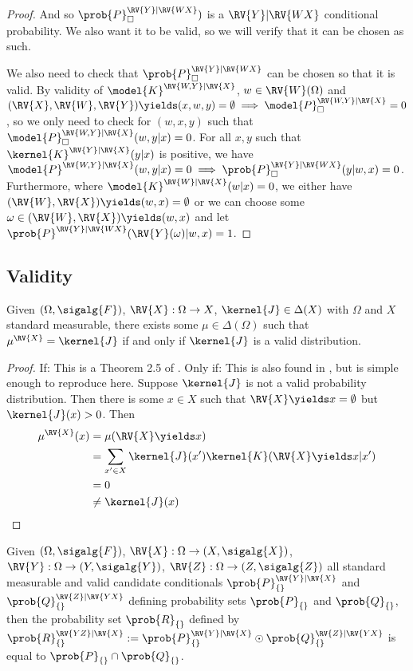 \begin{proof}
And so $\prob{P}_\square^{\RV{Y}|\RV{WX}})$ is a $\RV{Y}|\RV{WX}$ conditional probability. We also want it to be valid, so we will verify that it can be chosen as such.

We also need to check that $\prob{P}_\square^{\RV{Y}|\RV{WX}}$ can be chosen so that it is valid. By validity of $\model{K}^{\RV{W,Y}|\RV{X}}$, $w\in \RV{W}(\Omega)$ and $(\RV{X},\RV{W},\RV{Y})\yields(x,w,y)=\emptyset \implies \model{P}_\square^{\RV{W,Y}|\RV{X}}=0$, so we only need to check for $(w,x,y)$ such that $\model{P}_\square^{\RV{W,Y}|\RV{X}}(w,y|x)=0$. For all $x,y$ such that $\kernel{K}^{\RV{Y}|\RV{X}}(y|x)$ is positive, we have $\model{P}^{\RV{W,Y}|\RV{X}}(w,y|x)=0\implies \prob{P}_\square^{\RV{Y}|\RV{WX}}(y|w,x)=0$. Furthermore, where $\model{K}^{\RV{W}|\RV{X}}(w|x)=0$, we either have $(\RV{W},\RV{X})\yields(w,x)=\emptyset$ or we can choose some $\omega\in (\RV{W},\RV{X})\yields(w,x)$ and let $\prob{P}^{\RV{Y}|\RV{WX}}(\RV{Y}(\omega)|w,x) = 1$.
\end{proof}


\subsection{Validity}

\begin{theorem}[Validity]\label{th:completion}
Given $(\Omega,\sigalg{F})$, $\RV{X}:\Omega\to X$, $\kernel{J}\in \Delta(X)$ with $\Omega$ and $X$ standard measurable, there exists some $\mu\in \Delta(\Omega)$ such that $\mu^{\RV{X}}=\kernel{J}$ if and only if $\kernel{J}$ is a valid distribution.
\end{theorem}

\begin{proof}
If:
This is a Theorem 2.5 of \citet{ershov_extension_1975}.
Only if:
This is also found in \citet{ershov_extension_1975}, but is simple enough to reproduce here. Suppose $\kernel{J}$ is not a valid probability distribution. Then there is some $x\in X$ such that $\RV{X}\yields x = \emptyset$ but $\kernel{J}(x)>0$. Then
\begin{align}
    \mu^{\RV{X}}(x) &= \mu (\RV{X}\yields x)\\
    &= \sum_{x'\in X} \kernel{J}(x') \kernel{K}(\RV{X}\yields x|x')\\
    &= 0\\
    &\neq \kernel{J}(x)
\end{align}
\end{proof}


\begin{theorem}\label{th:intersection}
Given $(\Omega,\sigalg{F})$, $\RV{X}:\Omega\to (X,\sigalg{X})$, $\RV{Y}:\Omega\to (Y,\sigalg{Y})$, $\RV{Z}:\Omega\to (Z,\sigalg{Z})$ all standard measurable and valid candidate conditionals $\prob{P}_{\{\}}^{\RV{Y}|\RV{X}}$ and $\prob{Q}_{\{\}}^{\RV{Z}|\RV{YX}}$ defining probability sets $\prob{P}_{\{\}}$ and $\prob{Q}_{\{\}}$, then the probability set $\prob{R}_{\{\}}$ defined by $\prob{R}_{\{\}}^{\RV{YZ}|\RV{X}}:=\prob{P}_{\{\}}^{\RV{Y}|\RV{X}}\odot \prob{Q}_{\{\}}^{\RV{Z}|\RV{YX}}$ is equal to $\prob{P}_{\{\}}\cap\prob{Q}_{\{\}}$.
\end{theorem}

